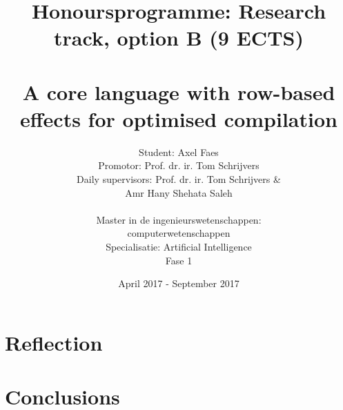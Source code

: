 \documentclass[notitlepage]{article}
\title{\vspace{-2cm}Honoursprogramme: Research track, option B (9 ECTS) \\\mbox{}\\ {A core language with row-based effects for optimised compilation}}
\author{Student: Axel Faes\\{ Promotor: Prof. dr. ir. Tom Schrijvers}\\{Daily supervisors:  Prof. dr. ir. Tom Schrijvers \&\\ Amr Hany Shehata Saleh}\\\mbox{}\\{Master in de ingenieurswetenschappen: \\computerwetenschappen}\\{Specialisatie: Artificial Intelligence}\\{Fase 1}}
\date{April 2017 - September 2017}
\begin{document}
\maketitle

\tableofcontents

\section{Reflection}


\section{Conclusions}


\appendix

\end{document}
